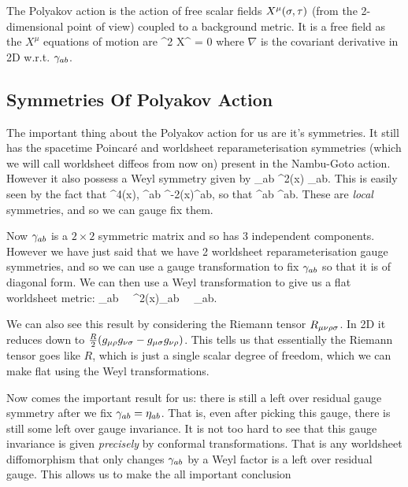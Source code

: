 The Polyakov action is the action of free scalar fields $X^{\mu}(\sigma,\tau)$ (from the 2-dimensional point of view) coupled to a background metric. It is a free field as the $X^{\mu}$ equations of motion are 
\bse 
    \nabla^2 X^{\mu} = 0 
\ese 
where $\nabla$ is the covariant derivative in 2D w.r.t. $\gamma_{ab}$. 

\subsection{Symmetries Of Polyakov Action}

The important thing about the Polyakov action for us are it's symmetries. It still has the spacetime Poincar\'{e} and worldsheet reparameterisation symmetries (which we will call worldsheet diffeos from now on) present in the Nambu-Goto action. However it also possess a Weyl symmetry given by 
\bse 
    \g_{ab} \to \Omega^2(x) \g_{ab}.
\ese 
This is easily seen by the fact that
\bse 
    \det\g \to \Omega^4(x)\det\g , \qand \g^{ab} \to \Omega^{-2}(x)\g^{ab},
\ese 
so that 
\bse 
    \sqrt{-\g} \g^{ab} \to \sqrt{-\g} \g^{ab}.
\ese 
These are \textit{local} symmetries, and so we can gauge fix them. 

Now $\gamma_{ab}$ is a $2\times 2$ symmetric matrix and so has $3$ independent components. However we have just said that we have 2 worldsheet reparameterisation gauge symmetries, and so we can use a gauge transformation to fix $\gamma_{ab}$ so that it is of diagonal form. We can then use a Weyl transformation to give us a flat worldsheet metric:
\bse 
    \g_{ab} \,  \, \Omega^2(x)\eta_{ab} \,  \, \eta_{ab}.
\ese 

\br 
    We can also see this result by considering the Riemann tensor $R_{\mu\nu\rho\sigma}$. In 2D it reduces down to $\frac{R}{2}(g_{\mu\rho} g_{\nu\sigma} - g_{\mu\sigma}g_{\nu\rho})$. This tells us that essentially the Riemann tensor goes like $R$, which is just a single scalar degree of freedom, which we can make flat using the Weyl transformations. 
\er 

Now comes the important result for us: there is still a left over residual gauge symmetry after we fix $\gamma_{ab}=\eta_{ab}$. That is, even after picking this gauge, there is still some left over gauge invariance. It is not too hard to see that this gauge invariance is given \textit{precisely} by conformal transformations. That is any worldsheet diffomorphism that only changes $\gamma_{ab}$ by a Weyl factor is a left over residual gauge. This allows us to make the all important conclusion

